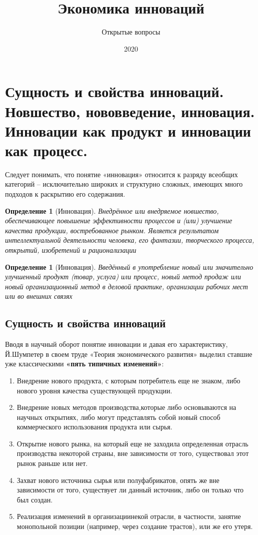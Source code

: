 \documentclass[11pt]{article}
\title{Экономика инноваций}
\author{Открытые вопросы}
\date{2020}
\theoremstyle{plain} %
\newtheorem{proposition}[theorem]{Определение}
\theoremstyle{definition} %
\theoremstyle{remark} %
\begin{document}
\maketitle
\section{Сущность и свойства инноваций.
Новшество, нововведение, инновация.
Инновации как продукт и инновации как процесс.}\label{erste}

Следует  понимать,  что  понятие  «инновация»  относится  к  разряду всеобщих  категорий – исключительно  широких  и  структурно  сложных, имеющих много подходов к раскрытию его содержания.

\begin{proposition}[Инновация]
Внедрённое или внедряемое новшество, обеспечивающее повышение эффективности процессов и (или) улучшение качества продукции, востребованное рынком. Является результатом интеллектуальной деятельности человека, его фантазии, творческого процесса, открытий, изобретений и рационализации
\end{proposition}

\begin{proposition}[Инновация]
Введённый в употребление новый или значительно улучшенный продукт (товар, услуга) или процесс, новый метод продаж или новый организационный метод в деловой практике, организации рабочих мест или во внешних связях
\end{proposition}

\subsection{Сущность и свойства инноваций}

Вводя в научный оборот понятие инновации и давая его характеристику, Й.Шумпетер в  своем  труде  «Теория  экономического  развития»  выделил  ставшие  уже  классическими {\bf «пять типичных изменений»}:

\begin{enumerate}
	\item Внедрение нового продукта, с которым потребитель еще не знаком, либо нового уровня качества существующей продукции.
	\item Внедрение   новых методов   производства,которые   либо основываются  на  научных  открытиях,  либо  могут  представлять  собой  новый способ коммерческого использования продукта или сырья.
	\item Открытие нового рынка, на который еще не заходила определенная отрасль производства некоторой страны, вне зависимости от того, существовал этот рынок раньше или нет.
	\item Захват нового источника сырья или полуфабрикатов, опять же вне зависимости от того, существует ли данный источник, либо он только что был создан.
	\item Реализация изменений  в  организациинекой  отрасли,  в  частности, занятие монопольной позиции (например, через создание трастов), или же его утеря.
\end{enumerate}
\end{document}

